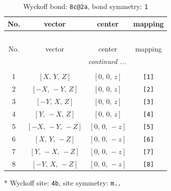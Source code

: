 \documentclass[fleqn,8pt]{jsarticle}
\begin{document}
\renewcommand{\arraystretch}{1.2}
\begin{longtable}{cccc}
\caption{Wyckoff bond: {\tt 8c@2a}, bond symmetry: {\tt 1}}
 \\
 \hline \hline
No. & vector & center & mapping \\ \hline \endfirsthead

\multicolumn{3}{l}{\tablename\ \thetable{}} \\
 \hline \hline
No. & vector & center & mapping \\ \hline \endhead

 \hline \hline
\multicolumn{3}{r}{\footnotesize\it continued ...} \\ \endfoot

 \hline \hline
\multicolumn{3}{r}{} \\ \endlastfoot

1 & $\left[ X,\, Y,\, Z \right]$ & $\left[ 0,\, 0,\, z \right]$ & {\tt [1]} \\ \hline
2 & $\left[ - X,\, - Y,\, Z \right]$ & $\left[ 0,\, 0,\, z \right]$ & {\tt [2]} \\ \hline
3 & $\left[ - Y,\, X,\, Z \right]$ & $\left[ 0,\, 0,\, z \right]$ & {\tt [3]} \\ \hline
4 & $\left[ Y,\, - X,\, Z \right]$ & $\left[ 0,\, 0,\, z \right]$ & {\tt [4]} \\ \hline
5 & $\left[ - X,\, - Y,\, - Z \right]$ & $\left[ 0,\, 0,\, - z \right]$ & {\tt [5]} \\ \hline
6 & $\left[ X,\, Y,\, - Z \right]$ & $\left[ 0,\, 0,\, - z \right]$ & {\tt [6]} \\ \hline
7 & $\left[ Y,\, - X,\, - Z \right]$ & $\left[ 0,\, 0,\, - z \right]$ & {\tt [7]} \\ \hline
8 & $\left[ - Y,\, X,\, - Z \right]$ & $\left[ 0,\, 0,\, - z \right]$ & {\tt [8]} \\
\end{longtable}
* Wyckoff site: {\tt 4b}, site symmetry: {\tt m..}
\renewcommand{\arraystretch}{1.2}
\end{document}
